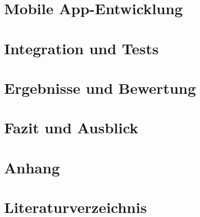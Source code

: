 \documentclass[a4paper, 10pt]{article} %
\begin{document}
\section{Mobile App-Entwicklung}
    

\section{Integration und Tests}
    

\section{Ergebnisse und Bewertung}


\section{Fazit und Ausblick}
    
\newpage

\section{Anhang}
    
\newpage

\section{Literaturverzeichnis}
% 
\printbibliography
\listoffigures
\listoftables
\end{document}

